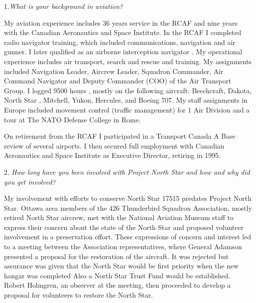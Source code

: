 \begin{multicols}{2}

1.\textit{What is your background in aviation?}

My aviation experience includes 36 years service in the RCAF and nine
years with the Canadian Aeronautics and Space Institute. In the RCAF I
completed radio navigator training, which included communications,
navigation and air gunner. I later qualified as an airborne
interception navigator . My operational experience includes air
transport, search and rescue and training. My assignments included
Navigation Leader, Aircrew Leader, Squadron Commander, Air Command
Navigator and Deputy Commander (COO) of the Air Transport Group. I
logged 9500 hours , mostly on the following aircraft: Beechcraft,
Dakota, North Star , Mitchell, Yukon, Hercules, and Boeing 707. My
staff assignments in Europe included movement control (traffic
management) for 1 Air Division and a tour at The NATO Defense College
in Rome. 

On retirement from the RCAF I participated in a Transport
Canada A Base review of several airports. I then secured full
employment with Canadian Aeronautics and Space Institute as Executive
Director, retiring in 1995.

2. \textit{How long have you been involved with Project North Star and how and why did you get involved?}

My involvement with efforts to conserve North Star 17515 predates
Project North Star. Ottawa area members of the 426 Thunderbird Squadron
Association, mostly retired North Star aircrew, met with the National
Aviation Museum staff to express their concern about the state of the
North Star and proposed volunteer involvement in a preservation effort.
These expressions of concern and interest led to a meeting between the
Association representatives, where General Adamson presented a proposal
for the restoration of the aircraft. It was rejected but assurance was
given that the North Star would be first priority when the new hangar
was completed Also a North Star Trust Fund would be established. Robert
Holmgren, an observer at the meeting, then proceeded to develop a
proposal for volunteers to restore the North Star.


\end{multicols}
